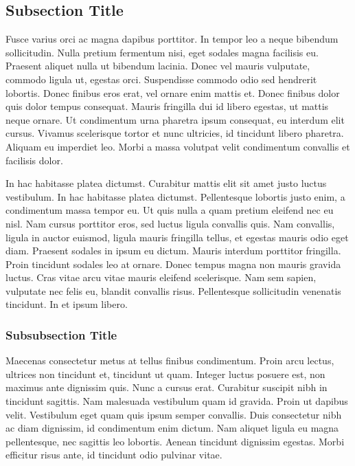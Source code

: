 \subsection{Subsection Title}

Fusce varius orci ac magna dapibus porttitor.
In tempor leo a neque bibendum sollicitudin.
Nulla pretium fermentum nisi, eget sodales magna facilisis eu.
Praesent aliquet nulla ut bibendum lacinia.
Donec vel mauris vulputate, commodo ligula ut, egestas orci.
Suspendisse commodo odio sed hendrerit lobortis.
Donec finibus eros erat, vel ornare enim mattis et.
Donec finibus dolor quis dolor tempus consequat.
Mauris fringilla dui id libero egestas, ut mattis neque ornare.
Ut condimentum urna pharetra ipsum consequat, eu interdum elit cursus.
Vivamus scelerisque tortor et nunc ultricies, id tincidunt libero pharetra.
Aliquam eu imperdiet leo.
Morbi a massa volutpat velit condimentum convallis et facilisis dolor.

In hac habitasse platea dictumst.
Curabitur mattis elit sit amet justo luctus vestibulum.
In hac habitasse platea dictumst.
Pellentesque lobortis justo enim, a condimentum massa tempor eu.
Ut quis nulla a quam pretium eleifend nec eu nisl.
Nam cursus porttitor eros, sed luctus ligula convallis quis.
Nam convallis, ligula in auctor euismod, ligula mauris fringilla tellus, et egestas mauris odio eget diam.
Praesent sodales in ipsum eu dictum.
Mauris interdum porttitor fringilla.
Proin tincidunt sodales leo at ornare.
Donec tempus magna non mauris gravida luctus.
Cras vitae arcu vitae mauris eleifend scelerisque.
Nam sem sapien, vulputate nec felis eu, blandit convallis risus.
Pellentesque sollicitudin venenatis tincidunt.
In et ipsum libero.



\subsubsection{Subsubsection Title} 

Maecenas consectetur metus at tellus finibus condimentum.
Proin arcu lectus, ultrices non tincidunt et, tincidunt ut quam.
Integer luctus posuere est, non maximus ante dignissim quis.
Nunc a cursus erat.
Curabitur suscipit nibh in tincidunt sagittis.
Nam malesuada vestibulum quam id gravida.
Proin ut dapibus velit.
Vestibulum eget quam quis ipsum semper convallis.
Duis consectetur nibh ac diam dignissim, id condimentum enim dictum.
Nam aliquet ligula eu magna pellentesque, nec sagittis leo lobortis.
Aenean tincidunt dignissim egestas.
Morbi efficitur risus ante, id tincidunt odio pulvinar vitae.



